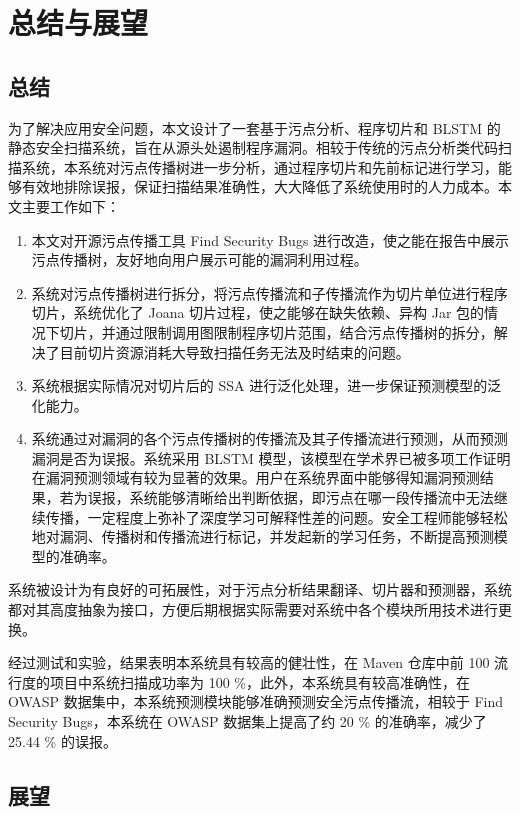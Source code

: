 \chapter{总结与展望}
\section{总结}
为了解决应用安全问题，本文设计了一套基于污点分析、程序切片和 BLSTM 的静态安全扫描系统，旨在从源头处遏制程序漏洞。相较于传统的污点分析类代码扫描系统，本系统对污点传播树进一步分析，通过程序切片和先前标记进行学习，能够有效地排除误报，保证扫描结果准确性，大大降低了系统使用时的人力成本。本文主要工作如下：


\begin{enumerate}
    \item 本文对开源污点传播工具 Find Security Bugs 进行改造，使之能在报告中展示污点传播树，友好地向用户展示可能的漏洞利用过程。
    \item 系统对污点传播树进行拆分，将污点传播流和子传播流作为切片单位进行程序切片，系统优化了 Joana 切片过程，使之能够在缺失依赖、异构 Jar 包的情况下切片，并通过限制调用图限制程序切片范围，结合污点传播树的拆分，解决了目前切片资源消耗大导致扫描任务无法及时结束的问题。
    \item 系统根据实际情况对切片后的 SSA 进行泛化处理，进一步保证预测模型的泛化能力。
    \item 系统通过对漏洞的各个污点传播树的传播流及其子传播流进行预测，从而预测漏洞是否为误报。系统采用 BLSTM 模型，该模型在学术界已被多项工作证明在漏洞预测领域有较为显著的效果。用户在系统界面中能够得知漏洞预测结果，若为误报，系统能够清晰给出判断依据，即污点在哪一段传播流中无法继续传播，一定程度上弥补了深度学习可解释性差的问题。安全工程师能够轻松地对漏洞、传播树和传播流进行标记，并发起新的学习任务，不断提高预测模型的准确率。
\end{enumerate}

系统被设计为有良好的可拓展性，对于污点分析结果翻译、切片器和预测器，系统都对其高度抽象为接口，方便后期根据实际需要对系统中各个模块所用技术进行更换。

经过测试和实验，结果表明本系统具有较高的健壮性，在 Maven 仓库中前 100 流行度的项目中系统扫描成功率为 100 \%，此外，本系统具有较高准确性，在 OWASP 数据集中，本系统预测模块能够准确预测安全污点传播流，相较于 Find Security Bugs，本系统在 OWASP 数据集上提高了约 20 \% 的准确率，减少了 25.44 \% 的误报。

\section{展望}

